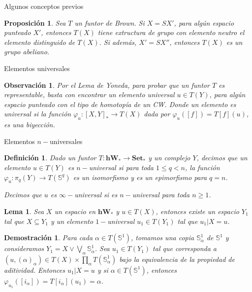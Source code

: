 \documentclass{beamer}
\newtheorem{pro}{Proposici\'on}
\newtheorem{lem}{Lema}
\newtheorem{df}{Definici\'on}
\newtheorem{obs}{Observaci\'on}
\newtheorem{dem}{Demostraci\'on}
\newcommand{\con}{\mathbf{Set}}
\newcommand{\W}{\mathbf{hW}}
\begin{document}
\begin{frame}{Algunos conceptos previos}
	\begin{pro}
		Sea $T$ un funtor de Brown. Si $X=SX'$, para algún espacio punteado $X'$, entonces $T(X)$ tiene extructura de grupo con elemento neutro el elemento distinguido de $T(X)$. Si además, $X'=SX''$, entonces $T(X)$ es un grupo abeliano.
	\end{pro}
\end{frame}

\begin{frame}{Elementos universales}
	\begin{obs}
		Por el Lema de Yoneda, para probar que un funtor $T$ es representable, basta con encontrar un elemento universal $u\in T(Y)$, para algún espacio punteado con el tipo de homotopía de un CW. Donde un elemento es universal si la función $\varphi_u \colon [X,Y]_\ast \to T(X)$ dada por $\varphi_u ([f])=T[f](u)$, es una biyección.
	\end{obs}
\end{frame}

\begin{frame}{Elementos $n-$universales}
	\begin{df}
		Dado un funtor $T\colon \W_\ast \to \con_\ast$ y un complejo $Y$, decimos que un elemento $u\in T(Y)$ es $n-$universal si para toda $1\leq q<n$, la función $\varphi_u \colon \pi_q(Y) \to T(\mathbb{S}^q)$ es un isomorfismo y es un epimorfismo para $q=n$.
		
		Decimos que $u$ es $\infty-$universal si es $n-$universal para toda $n\geq1$.
	\end{df}
\end{frame}

\begin{frame}
	\begin{lem}
		Sea $X$ un espacio en $\W_\ast$ y $u\in T(X)$, entonces existe un espacio $Y_1$ tal que $X\subseteq Y_1$ y un elemento $1-$universal $u_1\in T(Y_1 )$ tal que $u_1 |X=u$.
	\end{lem}
	
	\begin{dem}
		Para cada $\alpha\in T(\mathbb{S}^1)$, tomamos una copia $\mathbb{S}_\alpha ^1$ de $\mathbb{S}^1$ y consideramos $Y_1 = X \vee \bigvee_\alpha \mathbb{S}^1 _\alpha$. Sea $u_1 \in T(Y_1)$ tal que corresponda a $(u,(\alpha)_\alpha)\in T(X)\times \prod_\alpha T(\mathbb{S}_\alpha^1)$ bajo la equivalencia de la propiedad de aditividad. Entonces $u_1|X=u$ y si $\alpha\in T(\mathbb{S}^1)$, entonces $\varphi_{u_1}([i_\alpha])=T[i_\alpha](u_1)=\alpha$.
	\end{dem}
\end{frame}
\end{document}
